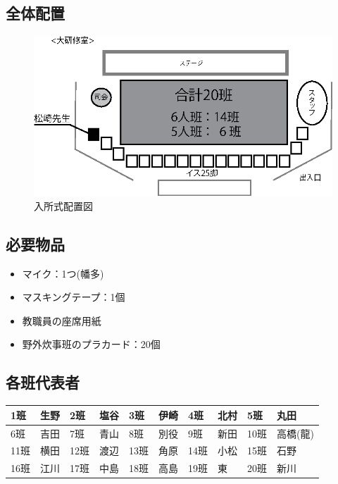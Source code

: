 \subsection{全体配置}
\begin{figure}[H]
  \begin{center}
  \includegraphics[scale=1.5]{./08/nyushoshiki.eps}
  \caption{入所式配置図}
  \label{nyusyosiki}
  \end{center}
\end{figure}


\subsection{必要物品}
\begin{itemize}
\item マイク：1つ(幡多)
\item マスキングテープ：1個
\item 教職員の座席用紙
\item 野外炊事班のプラカード：20個
\end{itemize}

\clearpage

\subsection{各班代表者}
\begin{table}[htb]
  \begin{center}
  \begin{tabular}{|l|l||l|l||l|l||l|l||l|l|} \hline
  1班 & 生野 & 2班 & 塩谷 & 3班 & 伊崎 & 4班 & 北村 & 5班 & 丸田 \\ \hline
  6班 & 吉田 & 7班 & 青山 & 8班 & 別役 & 9班 & 新田 & 10班 & 高橋(龍) \\  \hline
  11班 & 横田 & 12班 & 渡辺 & 13班 & 角原 & 14班 & 小松 & 15班 & 石野 \\ \hline
  16班 & 江川 & 17班 & 中島 & 18班 & 高島 & 19班 & 東 & 20班 & 新川 \\ \hline
    \end{tabular}
  \end{center}
\end{table}


